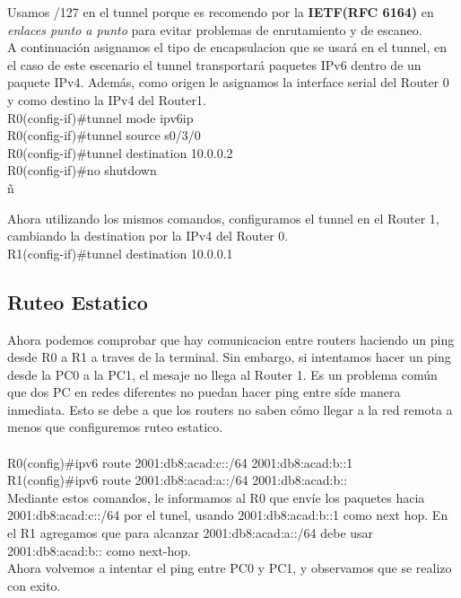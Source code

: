 \documentclass[a4paper,12pt]{article}
\begin{document}
Usamos /127 en el tunnel porque es recomendo por la \textbf{IETF(RFC 6164)} en \textit{enlaces punto a punto} para evitar problemas de enrutamiento y de escaneo.\\
A continuación asignamos el tipo de encapsulacion que se usará en el tunnel, en el caso de este escenario el tunnel transportará paquetes IPv6 dentro de un paquete IPv4. Además, como origen le asignamos la interface serial del Router 0 y como destino la IPv4 del Router1.\\

R0(config-if)\#tunnel mode ipv6ip\\
R0(config-if)\#tunnel source s0/3/0\\
R0(config-if)\#tunnel destination 10.0.0.2\\
R0(config-if)\#no shutdown\\ñ

Ahora utilizando los mismos comandos, configuramos el tunnel en el Router 1, cambiando la destination por la IPv4 del Router 0.\\
R1(config-if)\#tunnel destination 10.0.0.1\\

\subsection{Ruteo Estatico}
Ahora podemos comprobar que hay comunicacion entre routers haciendo un ping desde R0 a R1 a traves de la terminal. Sin embargo, si intentamos hacer un ping desde la PC0 a la PC1, el mesaje no llega al Router 1. Es un problema común que dos PC en redes diferentes no puedan hacer ping entre síde manera inmediata. Esto se debe a que los routers no saben cómo llegar a la red remota a menos que configuremos ruteo estatico.\\
\noindent\\
R0(config)\#ipv6 route 2001:db8:acad:c::/64 2001:db8:acad:b::1\\
R1(config)\#ipv6 route 2001:db8:acad:a::/64 2001:db8:acad:b::\\

Mediante estos comandos, le informamos al R0 que envíe los paquetes hacia 2001:db8:acad:c::/64 por el tunel, usando 2001:db8:acad:b::1 como next hop. En el R1 agregamos que para alcanzar 2001:db8:acad:a::/64 debe usar 2001:db8:acad:b:: como next-hop.\\

Ahora volvemos a intentar el ping entre PC0 y PC1, y observamos que se realizo con exito.\\
\end{document}
